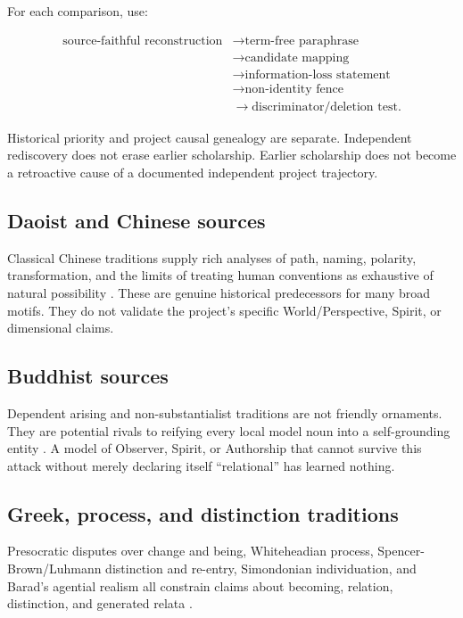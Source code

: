 \documentclass[11pt]{article}
\begin{document}
For each comparison, use:

\begin{equation}
\begin{aligned}
\text{source-faithful reconstruction}
&\rightarrow \text{term-free paraphrase}\\
&\rightarrow \text{candidate mapping}\\
&\rightarrow \text{information-loss statement}\\
&\rightarrow \text{non-identity fence}\\
&\rightarrow \text{discriminator/deletion test}.
\end{aligned}
\end{equation}

Historical priority and project causal genealogy are separate. Independent rediscovery does not erase earlier scholarship. Earlier scholarship does not become a retroactive cause of a documented independent project trajectory.

\subsection{Daoist and Chinese sources}

Classical Chinese traditions supply rich analyses of path, naming, polarity, transformation, and the limits of treating human conventions as exhaustive of natural possibility \cite{Hansen2025Daoism,SEPChineseMetaphysics2023,Wang2013Yinyang}. These are genuine historical predecessors for many broad motifs. They do not validate the project's specific World/Perspective, Spirit, or dimensional claims.

\subsection{Buddhist sources}

Dependent arising and non-substantialist traditions are not friendly ornaments. They are potential rivals to reifying every local model noun into a self-grounding entity \cite{SEPBuddha2024}. A model of Observer, Spirit, or Authorship that cannot survive this attack without merely declaring itself ``relational'' has learned nothing.

\subsection{Greek, process, and distinction traditions}

Presocratic disputes over change and being, Whiteheadian process, Spencer-Brown/Luhmann distinction and re-entry, Simondonian individuation, and Barad's agential realism all constrain claims about becoming, relation, distinction, and generated relata \cite{SEPPresocratics2020,SEPParmenides2025,Whitehead1978Process,SpencerBrown1969,Luhmann2006Difference,Simondon2020Individuation,Barad2007}.
\end{document}
